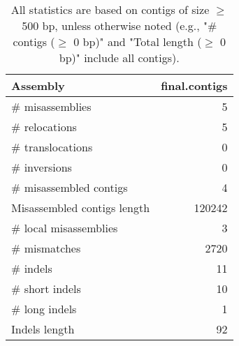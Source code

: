 \documentclass[12pt,a4paper]{article}
\begin{document}
\begin{table}[ht]
\begin{center}
\caption{All statistics are based on contigs of size $\geq$ 500 bp, unless otherwise noted (e.g., "\# contigs ($\geq$ 0 bp)" and "Total length ($\geq$ 0 bp)" include all contigs).}
\begin{tabular}{|l*{1}{|r}|}
\hline
Assembly & final.contigs \\ \hline
\# misassemblies & 5 \\ \hline
\hspace{5mm}\# relocations & 5 \\ \hline
\hspace{5mm}\# translocations & 0 \\ \hline
\hspace{5mm}\# inversions & 0 \\ \hline
\# misassembled contigs & 4 \\ \hline
Misassembled contigs length & 120242 \\ \hline
\# local misassemblies & 3 \\ \hline
\# mismatches & 2720 \\ \hline
\# indels & 11 \\ \hline
\hspace{5mm}\# short indels & 10 \\ \hline
\hspace{5mm}\# long indels & 1 \\ \hline
Indels length & 92 \\ \hline
\end{tabular}
\end{center}
\end{table}
\end{document}
